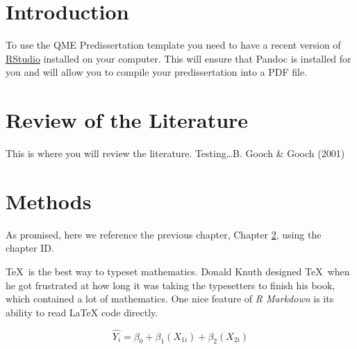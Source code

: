 \documentclass[12pt,letterpaper,oneside,oldfontcommands]{memoir}
\theoremstyle{definition}
\theoremstyle{definition}
\theoremstyle{definition}
\theoremstyle{remark}
\begin{document}
\clearpage
\pagestyle{ruled}

\tableofcontents*
\clearpage

\listoftables
\clearpage

\listoffigures
\clearpage





\mainmatter

\SingleSpacing

\hypertarget{intro}{%
\chapter{Introduction}\label{intro}}

To use the QME Predissertation template you need to have a recent
version of
\href{http://www.rstudio.com/products/rstudio/download/}{RStudio}
installed on your computer. This will ensure that Pandoc is installed
for you and will allow you to compile your predissertation into a PDF
file.

\clearpage

\hypertarget{review}{%
\chapter{Review of the Literature}\label{review}}

This is where you will review the literature. Testing\ldots{}B. Gooch \&
Gooch (2001)

\clearpage

\hypertarget{methods}{%
\chapter{Methods}\label{methods}}

As promised, here we reference the previous chapter, Chapter
\ref{review}, using the chapter ID.

\TeX~is the best way to typeset mathematics. Donald Knuth designed
\TeX~when he got frustrated at how long it was taking the typesetters to
finish his book, which contained a lot of mathematics. One nice feature
of \emph{R Markdown} is its ability to read LaTeX code directly.

\[
\hat{Y_i} = \beta_0 + \beta_1(X_{1i}) + \beta_2(X_{2i})
\]
\end{document}
